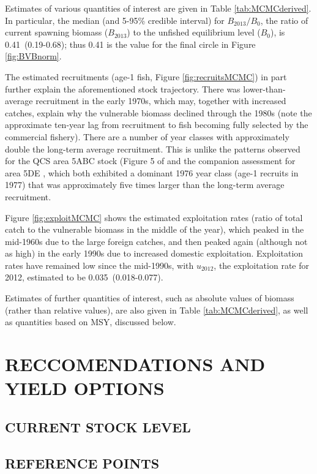 Estimates of various quantities of interest are given in Table \ref{tab:MCMCderived}. In particular, the median (and 5-95\% credible interval) for $B_{2013}/B_0$, the ratio of current spawning biomass ($B_{2013}$) to the unfished equilibrium level ($B_0$), is 0.41~(0.19-0.68); thus 0.41 is the value for the final circle in Figure \ref{fig:BVBnorm}.

The estimated recruitments (age-1 fish, Figure \ref{fig:recruitsMCMC}) in part further explain the aforementioned stock trajectory. There was lower-than-average recruitment in the early 1970s, which may, together with increased catches, explain why the vulnerable biomass declined through the 1980s (note the approximate ten-year lag from recruitment to fish becoming fully selected by the commercial fishery). There are a number of year classes with approximately double the long-term average recruitment. This is unlike the patterns observed for the QCS area 5ABC stock (Figure 5 of  and the companion assessment for area 5DE , which both exhibited a dominant 1976 year class (age-1 recruits in 1977) that was approximately five times larger than the long-term average recruitment.

Figure \ref{fig:exploitMCMC} shows the estimated exploitation rates (ratio of total catch to the vulnerable biomass in the middle of the year), which peaked in the mid-1960s due to the large foreign catches, and then peaked again (although not as high) in the early 1990s due to increased domestic exploitation. Exploitation rates have remained low since the mid-1990s, with $u_{2012}$, the exploitation rate for 2012, estimated to be 0.035~(0.018-0.077).

Estimates of further quantities of interest, such as absolute values of biomass (rather than relative values), are also given in Table \ref{tab:MCMCderived}, as well as quantities based on MSY, discussed below.

\section{RECCOMENDATIONS AND YIELD OPTIONS}

\subsection{CURRENT STOCK LEVEL}

\subsection{REFERENCE POINTS}

